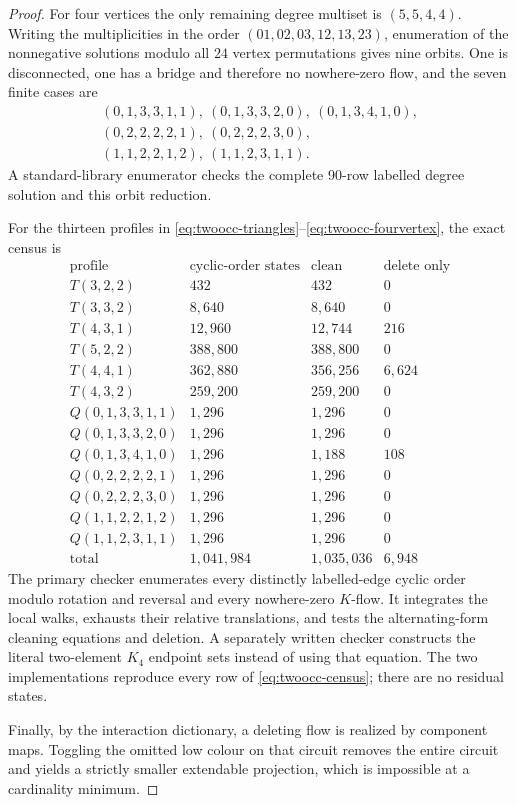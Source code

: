 \documentclass[11pt]{article}
\theoremstyle{definition}
\theoremstyle{remark}
\begin{document}
\begin{proof}
For four vertices the only remaining degree multiset is
\((5,5,4,4)\).  Writing the multiplicities in the order
\((01,02,03,12,13,23)\), enumeration of the nonnegative solutions
modulo all \(24\) vertex permutations gives nine orbits.  One is
disconnected, one has a bridge and therefore no nowhere-zero flow, and
the seven finite cases are
\[
\begin{gathered}
(0,1,3,3,1,1),\ (0,1,3,3,2,0),\
(0,1,3,4,1,0),\\
(0,2,2,2,2,1),\ (0,2,2,2,3,0),\\
(1,1,2,2,1,2),\ (1,1,2,3,1,1).
\end{gathered}                                             \tag{26n}\label{eq:twoocc-fourvertex}
\]
A standard-library enumerator checks the complete 90-row labelled
degree solution and this orbit reduction.

For the thirteen profiles in
\eqref{eq:twoocc-triangles}--\eqref{eq:twoocc-fourvertex}, the exact census
is
\[
\begin{array}{c|r|r|r}
\text{profile}&\text{cyclic-order states}&\text{clean}
 &\text{delete only}\\ \hline
T(3,2,2)&432&432&0\\
T(3,3,2)&8{,}640&8{,}640&0\\
T(4,3,1)&12{,}960&12{,}744&216\\
T(5,2,2)&388{,}800&388{,}800&0\\
T(4,4,1)&362{,}880&356{,}256&6{,}624\\
T(4,3,2)&259{,}200&259{,}200&0\\
Q(0,1,3,3,1,1)&1{,}296&1{,}296&0\\
Q(0,1,3,3,2,0)&1{,}296&1{,}296&0\\
Q(0,1,3,4,1,0)&1{,}296&1{,}188&108\\
Q(0,2,2,2,2,1)&1{,}296&1{,}296&0\\
Q(0,2,2,2,3,0)&1{,}296&1{,}296&0\\
Q(1,1,2,2,1,2)&1{,}296&1{,}296&0\\
Q(1,1,2,3,1,1)&1{,}296&1{,}296&0\\ \hline
\text{total}&1{,}041{,}984&1{,}035{,}036&6{,}948
\end{array}                                                \tag{26o}\label{eq:twoocc-census}
\]
The primary checker enumerates every distinctly labelled-edge cyclic
order modulo rotation and reversal and every nowhere-zero \(K\)-flow.
It integrates the local walks, exhausts their relative translations,
and tests the alternating-form cleaning equations and deletion.
A separately written checker constructs the literal two-element
\(K_4\) endpoint sets instead of using that equation.  The two
implementations reproduce every row of \eqref{eq:twoocc-census}; there are no
residual states.

Finally, by the interaction dictionary, a deleting flow is realized by
component maps.  Toggling the omitted low colour on that circuit removes
the entire circuit and yields a strictly smaller extendable projection,
which is impossible at a cardinality minimum.
\end{proof}
\end{document}
